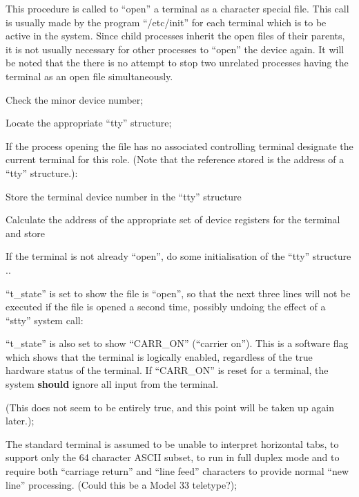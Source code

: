 This procedure is called to ``open'' a
terminal as a character special file.
This call is usually made by the program ``/etc/init'' for each terminal
which is to be active in the system.
Since child processes inherit the open
files of their parents, it is not usually necessary for other processes to
``open'' the device again. It will be
noted that the there is no attempt to
stop two unrelated processes having the
terminal as an open file simultaneously.

\bd
\item[8026:] Check the minor device number;

\item[8030:] Locate the appropriate ``tty''
structure;

\item[8031:] If the process opening the file
has no associated controlling
terminal designate the current
terminal for this role. (Note
that the reference stored is the
address of a ``tty'' structure.):

\item[8033:] Store the terminal device number
in the ``tty'' structure

\item[8039:] Calculate the address of the
appropriate set of device registers for the
terminal and store

\item[8045:] If the terminal is not already
``open'', do some initialisation of
the ``tty'' structure ..

\item[8046:] ``t\_state'' is set to show the file
is ``open'', so that the next three
lines will not be executed if the
file is opened a second time,
possibly undoing the effect of a
``stty'' system call:

``t\_state'' is also set to show
``CARR\_ON'' (``carrier on''). This is
a software flag which shows that
the terminal is logically
enabled, regardless of the true
hardware status of the terminal.
If ``CARR\_ON'' is reset for a terminal, the system {\bf should} ignore
all input from the terminal.

(This does not seem to be
entirely true, and this point
will be taken up again later.);

\item[8047:] The standard terminal is assumed
to be unable to interpret horizontal tabs, to support only the
64 character ASCII subset, to run
in full duplex mode and to
require both ``carriage return''
and ``line feed'' characters to
provide normal ``new line'' processing. (Could this be a Model
33 teletype?);

